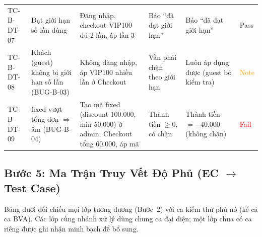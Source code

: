 \documentclass[12pt, a4paper]{report}
\begin{document}
\begin{longtable}{C{1.1cm} L{3.1cm} L{3.2cm} L{3cm} C{2cm} C{1.4cm}}
    TC-B-DT-07 & Đạt giới hạn số lần dùng & Đăng nhập, checkout VIP100 đủ 2 lần, áp lần 3 & Báo ``đã đạt giới hạn'' & Báo ``đã đạt giới hạn'' & \textcolor{green!60!black}{Pass} \\
    TC-B-DT-08 & Khách (guest) không bị giới hạn số lần \newline (BUG-B-03) & Không đăng nhập, áp VIP100 nhiều lần ở Checkout & Vẫn phải chặn theo giới hạn & Luôn áp dụng được (guest bỏ kiểm tra) & \textcolor{orange}{Note} \\
    TC-B-DT-09 & fixed vượt tổng đơn $\Rightarrow$ âm \newline (BUG-B-04) & Tạo mã fixed (discount 100.000, min 50.000) ở admin; Checkout tổng 60.000, áp mã & Thành tiền $\ge 0$, có chặn & Thành tiền $= -40.000$ (không chặn) & \textcolor{red}{Fail} \\
\end{longtable}

\subsection{Bước 5: Ma Trận Truy Vết Độ Phủ (EC $\to$ Test Case)}
Bảng dưới đối chiếu mọi lớp tương đương (Bước~2) với ca kiểm thử phủ nó (kể cả ca BVA). Các lớp
cùng nhánh xử lý dùng chung ca đại diện; một lớp chưa có ca riêng được ghi nhận minh bạch để bổ
sung.
\end{document}
